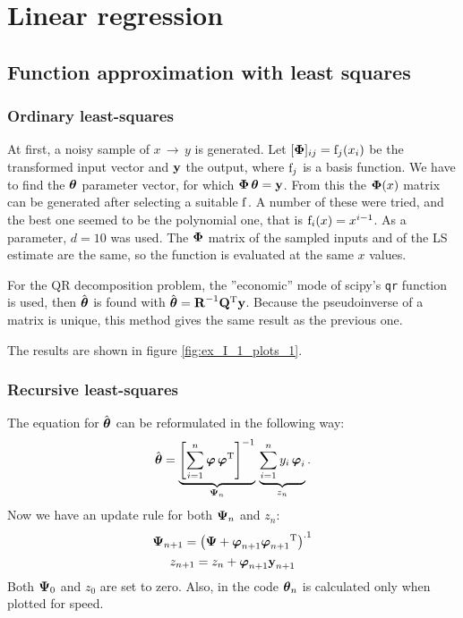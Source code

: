 \section{Linear regression}

\subsection{Function approximation with least squares}


\subsubsection*{Ordinary least-squares}

At first, a noisy sample of $x\,\rightarrow\,y$ is generated.
Let $[\boldsymbol{\mathrm{\Phi}}]_{ij}=\mathrm{f}_j(x_i)$ be the transformed input vector and $\boldsymbol{\mathrm{y}}$ the output,
where $\mathrm{f}_j$ is a basis function. We have to find the $\boldsymbol{\mathrm{\theta}}$ parameter vector,
for which $\boldsymbol{\mathrm{\Phi}}\,\boldsymbol{\mathrm{\theta}}=\boldsymbol{\mathrm{y}}$. From this the $\boldsymbol{\mathrm{\Phi}}(x)$ matrix can be generated
after selecting a suitable $\mathrm{f}$. A number of these were tried, and the best one
seemed to be the polynomial one, that is $\mathrm{f}_{i}(x) = x^{i-1}$.
As a parameter, $d=10$ was used.
The $\boldsymbol{\mathrm{\Phi}}$ matrix of the sampled inputs and of the LS estimate are the same,
so the function is evaluated at the same $x$ values.

For the QR decomposition problem, the ''economic'' mode of scipy's \verb|qr| function
is used, then $\hat{\boldsymbol{\mathrm{\theta}}}$ is found with $\hat{\boldsymbol{\mathrm{\theta}}} = \boldsymbol{\mathrm{R}}^{-1}\boldsymbol{\mathrm{Q}}\textsuperscript{T}\boldsymbol{\mathrm{y}}$.
Because the pseudoinverse of a matrix is unique,
this method gives the same result as the previous one.

The results are shown in figure \ref{fig:ex_I_1_plots_1}.

\subsubsection*{Recursive least-squares}

The equation for $\hat{\boldsymbol{\mathrm{\theta}}}$ can be reformulated in the following way:
\begin{equation}
	\hat{\boldsymbol{\mathrm{\theta}}} = \underbrace{\left[\sum\limits_{i=1}^n{\boldsymbol{\mathrm{\varphi}}\,\boldsymbol{\mathrm{\varphi}}\textsuperscript{T}}\right]^{-1}}_{\boldsymbol{\mathrm{\Psi}}_n}\,
	\underbrace{\sum\limits_{i=1}^n{y_{i}\,\boldsymbol{\mathrm{\varphi}}_{i} }}_{z_n}.
\end{equation}
Now we have an update rule for both $\boldsymbol{\mathrm{\Psi}}_n$ and $z_n$:
\begin{equation}
	\boldsymbol{\mathrm{\Psi}}_{n+1} = \left(\boldsymbol{\mathrm{\Psi}} + \boldsymbol{\mathrm{\varphi}}_{n+1}\boldsymbol{\mathrm{\varphi}}_{n+1}\textsuperscript{T}\right)^{.1}
\end{equation}
\begin{equation}
	z_{n+1} = z_n + \boldsymbol{\mathrm{\varphi}}_{n+1}\boldsymbol{\mathrm{y}}_{n+1}
\end{equation}
Both $\boldsymbol{\mathrm{\Psi}}_0$ and $z_0$ are set to zero. 
Also, in the code $\boldsymbol{\mathrm{\theta}}_n$ is calculated only when plotted for speed.

